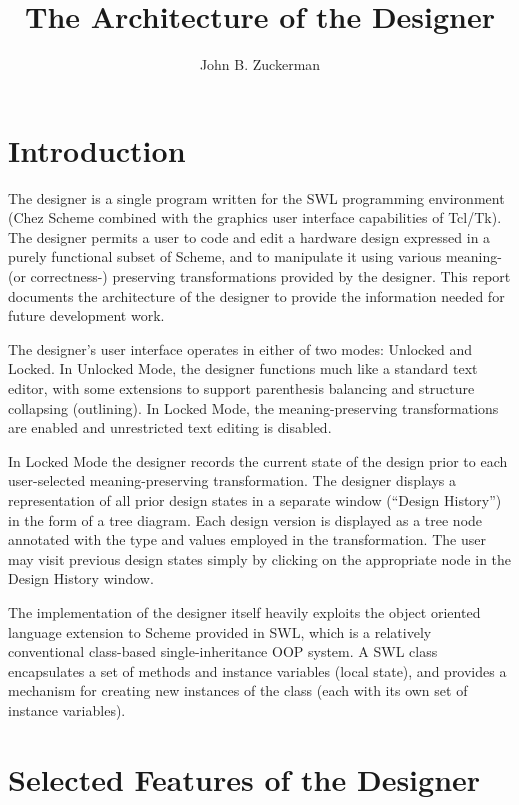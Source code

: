 \documentclass{article}
\title{The Architecture of the Designer}
\author{John B. Zuckerman}
\begin{document}
\maketitle


\section{Introduction}

The designer is a single program written for the {\sc SWL}\cite{SWL}
programming environment (Chez Scheme\cite{TSPL} combined with the
graphics user interface capabilities of Tcl/Tk\cite{TCLTK}).  The
designer permits a user to code and edit a hardware design expressed
in a purely functional subset of Scheme, and to manipulate it using
various meaning- (or correctness-) preserving transformations provided
by the designer.  This report documents the architecture of the
designer to provide the information needed for future development
work.

The designer's user interface operates in either of two modes: Unlocked
and Locked.  In Unlocked Mode, the designer functions much like a
standard text editor, with some extensions to support parenthesis
balancing and structure collapsing (outlining).  In Locked Mode, the
meaning-preserving transformations are enabled and unrestricted text
editing is disabled.

In Locked Mode the designer records the current state of the design
prior to each user-selected meaning-preserving transformation.  The
designer displays a representation of all prior design states in a
separate window (``Design History'') in the form of a tree diagram.
Each design version is displayed as a tree node annotated with the
type and values employed in the transformation.  The user may visit
previous design states simply by clicking on the appropriate node in
the Design History window.

The implementation of the designer itself heavily exploits the object
oriented language extension to Scheme provided in {\sc SWL}, which is a
relatively conventional class-based single-inheritance OOP system.  A
{\sc SWL} class encapsulates a set of methods and instance variables (local
state), and provides a mechanism for creating new instances of the
class (each with its own set of instance variables).


\section{Selected Features of the Designer}
\end{document}
